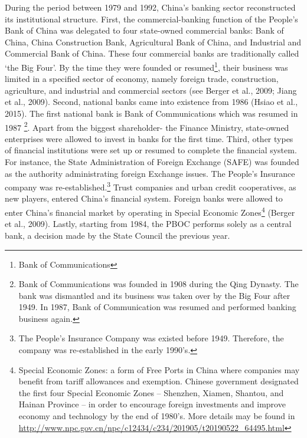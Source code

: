 \documentclass[
  letterpaper,
  DIV=11,
  numbers=noendperiod]{scrreprt}
\begin{document}
During the period between 1979 and 1992, China's banking sector
reconstructed its institutional structure. First, the commercial-banking
function of the People's Bank of China was delegated to four state-owned
commercial banks: Bank of China, China Construction Bank, Agricultural
Bank of China, and Industrial and Commercial Bank of China. These four
commercial banks are traditionally called `the Big Four'. By the time
they were founded or resumed\footnote{Bank of Communications}, their
business was limited in a specified sector of economy, namely foreign
trade, construction, agriculture, and industrial and commercial sectors
(see Berger et al., 2009; Jiang et al., 2009). Second, national banks
came into existence from 1986 (Hsiao et al., 2015). The first national
bank is Bank of Communications which was resumed in 1987 \footnote{Bank
  of Communications was founded in 1908 during the Qing Dynasty. The
  bank was dismantled and its business was taken over by the Big Four
  after 1949. In 1987, Bank of Communication was resumed and performed
  banking business again.}. Apart from the biggest shareholder- the
Finance Ministry, state-owned enterprises were allowed to invest in
banks for the first time. Third, other types of financial institutions
were set up or resumed to complete the financial system. For instance,
the State Administration of Foreign Exchange (SAFE) was founded as the
authority administrating foreign Exchange issues. The People's Insurance
company was re-established.\footnote{The People's Insurance Company was
  existed before 1949. Therefore, the company was re-established in the
  early 1990's.} Trust companies and urban credit cooperatives, as new
players, entered China's financial system. Foreign banks were allowed to
enter China's financial market by operating in Special Economic
Zones\footnote{Special Economic Zones: a form of Free Ports in China
  where companies may benefit from tariff allowances and exemption.
  Chinese government designated the first four Special Economic Zones --
  Shenzhen, Xiamen, Shantou, and Hainan Province -- in order to
  encourage foreign investments and improve economy and technology by
  the end of 1980's. More details may be found in
  \url{http://www.npc.gov.cn/npc/c12434/c234/201905/t20190522_64495.html}}
(Berger et al., 2009). Lastly, starting from 1984, the PBOC performs
solely as a central bank, a decision made by the State Council the
previous year.
\end{document}
